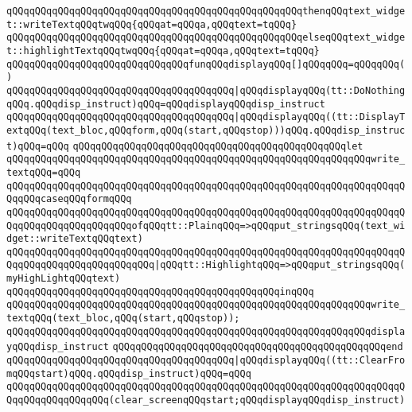\verb|qQQqqQQqqQQqqQQqqQQqqQQqqQQqqQQqqQQqqQQqqQQqqQQqqQQqthenqQQqtext_widget::writeTextqQQqtwqQQq{qQQqat=qQQqa,qQQqtext=tqQQq}|\newline
\verb|qQQqqQQqqQQqqQQqqQQqqQQqqQQqqQQqqQQqqQQqqQQqqQQqqQQqelseqQQqtext_widget::highlightTextqQQqtwqQQq{qQQqat=qQQqa,qQQqtext=tqQQq}|\newline
\newline
\verb|qQQqqQQqqQQqqQQqqQQqqQQqqQQqqQQqfunqQQqdisplayqQQq[]qQQqqQQq=qQQqqQQq()|\newline
\verb|qQQqqQQqqQQqqQQqqQQqqQQqqQQqqQQqqQQqqQQq|\verb#|qQQqdisplayqQQq(tt::DoNothingqQQq.qQQqdisp_instruct)qQQq=qQQqdisplayqQQqdisp_instruct#\newline
\verb|qQQqqQQqqQQqqQQqqQQqqQQqqQQqqQQqqQQqqQQq|\verb#|qQQqdisplayqQQq((tt::DisplayTextqQQq(text_bloc,qQQqform,qQQq(start,qQQqstop)))qQQq.qQQqdisp_instruct)qQQq=qQQq#\newline
\verb|qQQqqQQqqQQqqQQqqQQqqQQqqQQqqQQqqQQqqQQqqQQqqQQqlet|\newline
\verb|qQQqqQQqqQQqqQQqqQQqqQQqqQQqqQQqqQQqqQQqqQQqqQQqqQQqqQQqqQQqqQQqwrite_textqQQq=qQQq|\newline
\verb|qQQqqQQqqQQqqQQqqQQqqQQqqQQqqQQqqQQqqQQqqQQqqQQqqQQqqQQqqQQqqQQqqQQqqQQqqQQqcaseqQQqformqQQq|\newline
\verb|qQQqqQQqqQQqqQQqqQQqqQQqqQQqqQQqqQQqqQQqqQQqqQQqqQQqqQQqqQQqqQQqqQQqqQQqqQQqqQQqqQQqqQQqqQQqofqQQqtt::PlainqQQq=>qQQqput_stringsqQQq(text_widget::writeTextqQQqtext)|\newline
\verb|qQQqqQQqqQQqqQQqqQQqqQQqqQQqqQQqqQQqqQQqqQQqqQQqqQQqqQQqqQQqqQQqqQQqqQQqqQQqqQQqqQQqqQQqqQQqqQQq|\verb#|qQQqtt::HighlightqQQq=>qQQqput_stringsqQQq(myHighLightqQQqtext)#\newline
\verb|qQQqqQQqqQQqqQQqqQQqqQQqqQQqqQQqqQQqqQQqqQQqqQQqinqQQq|\newline
\verb|qQQqqQQqqQQqqQQqqQQqqQQqqQQqqQQqqQQqqQQqqQQqqQQqqQQqqQQqqQQqqQQqwrite_textqQQq(text_bloc,qQQq(start,qQQqstop));|\newline
\verb|qQQqqQQqqQQqqQQqqQQqqQQqqQQqqQQqqQQqqQQqqQQqqQQqqQQqqQQqqQQqqQQqdisplayqQQqdisp_instruct|\newline
\verb|qQQqqQQqqQQqqQQqqQQqqQQqqQQqqQQqqQQqqQQqqQQqqQQqend|\newline
\newline
\verb|qQQqqQQqqQQqqQQqqQQqqQQqqQQqqQQqqQQqqQQq|\verb#|qQQqdisplayqQQq((tt::ClearFromqQQqstart)qQQq.qQQqdisp_instruct)qQQq=qQQq#\newline
\verb|qQQqqQQqqQQqqQQqqQQqqQQqqQQqqQQqqQQqqQQqqQQqqQQqqQQqqQQqqQQqqQQqqQQqqQQqqQQqqQQqqQQqqQQq(clear_screenqQQqstart;qQQqdisplayqQQqdisp_instruct)|\newline
